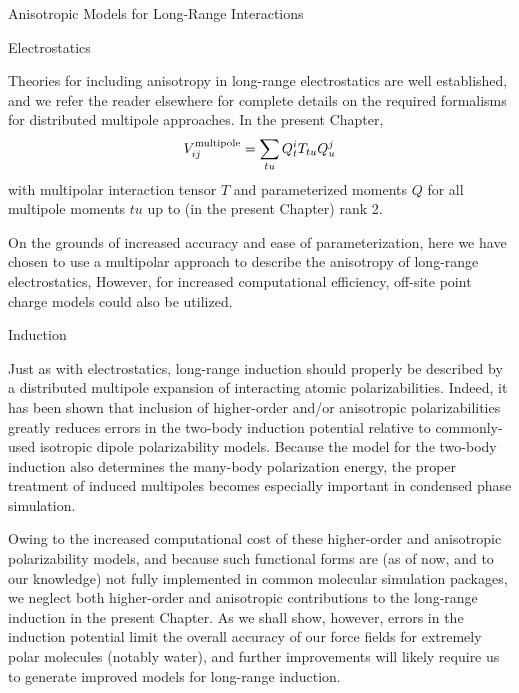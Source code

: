 \begin{subsection}{Anisotropic Models for Long-Range Interactions}

\begin{subsubsection}{Electrostatics}

Theories for including anisotropy in long-range electrostatics are well
established, and we refer the reader
elsewhere for complete details on the required formalisms for distributed multipole approaches.
\cite{stone2013theory,Stone2007}
In the present Chapter, 
\[
V^{\text{multipole}}_{ij} = \sum\limits_{tu}Q_t^iT_{tu}Q_u^j
\]
with multipolar interaction tensor $T$ and parameterized moments $Q$ for all
multipole moments $tu$ up to (in the present Chapter) rank 2.

On the grounds of increased accuracy and ease of parameterization, here we have chosen 
to use a multipolar approach to describe the anisotropy of
long-range electrostatics,
However, for increased computational efficiency, off-site point charge models
\cite{Cardamone2014}
could also be utilized.

\end{subsubsection}
\begin{subsubsection}{Induction}

Just as with electrostatics, long-range induction should properly be described
by a distributed multipole expansion of interacting atomic
polarizabilities.\cite{Stone2007,Misquitta2016} Indeed, it has been shown
that inclusion of higher-order and/or anisotropic polarizabilities greatly
reduces errors in the two-body induction potential relative to commonly-used isotropic
dipole polarizability models.\cite{Misquitta2008b,Holt2008,Holt2010,Schmidt2015,Shi2013}
Because the model for the two-body induction also determines the many-body
polarization energy, the proper treatment of induced multipoles becomes especially
important in condensed phase simulation.\cite{stone2013theory,Schmidt2015,Shi2013}

Owing to the increased computational cost of these higher-order and anisotropic polarizability
models, and because such functional forms are (as of now, and to our
knowledge) not fully implemented in common molecular simulation packages, we
neglect
both higher-order and anisotropic contributions to the long-range induction in
the present Chapter. As
we shall show, however, errors in the induction potential limit the overall accuracy of
our force fields for extremely polar molecules (notably water), and
further improvements will likely require us to generate improved models for long-range induction. 


\end{subsubsection}
\end{subsection}
